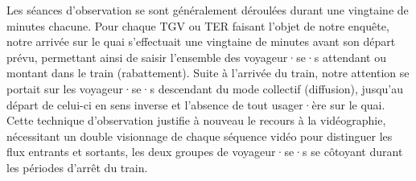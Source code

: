 \begin{refsegment}
Les séances d'observation se sont généralement déroulées durant une vingtaine de minutes chacune. Pour chaque \acrshort{TGV} ou \acrshort{TER} faisant l'objet de notre enquête, notre arrivée sur le quai s'effectuait une vingtaine de minutes avant son départ prévu, permettant ainsi de saisir l'ensemble des voyageur·se·s attendant ou montant dans le train (rabattement). Suite à l'arrivée du train, notre attention se portait sur les voyageur·se·s descendant du mode collectif (diffusion), jusqu'au départ de celui-ci en sens inverse et l'absence de tout usager·ère sur le quai. Cette technique d'observation justifie à nouveau le recours à la vidéographie, nécessitant un double visionnage de chaque séquence vidéo pour distinguer les flux entrants et sortants, les deux groupes de voyageur·se·s se côtoyant durant les périodes d'arrêt du train.%


\end{refsegment}
